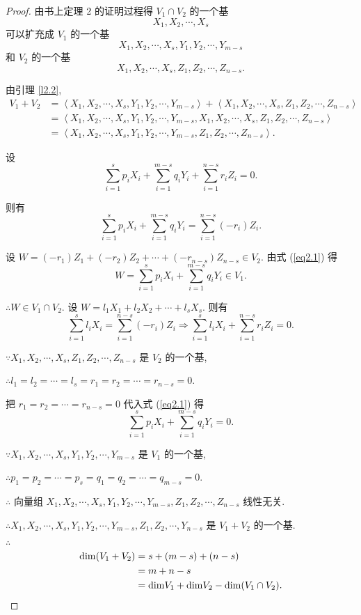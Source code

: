 \documentclass[color=black,device=normal,lang=cn,mode=geye]{elegantnote}
\begin{document}
\begin{proof}
    由书上定理 2 的证明过程得 $V_1\cap V_2$ 的一个基
    \[X_1,X_2,\cdots,X_s\]
    可以扩充成 $V_1$ 的一个基
    \[X_1,X_2,\cdots,X_s,Y_1,Y_2,\cdots,Y_{m-s}\]
    和 $V_2$ 的一个基
    \[X_1,X_2,\cdots,X_s,Z_1,Z_2,\cdots,Z_{n-s}.\]

    由引理 \ref{l2.2},
    \begin{align*}
        V_1+V_2 & =\left<X_1,X_2,\cdots,X_s,Y_1,Y_2,\cdots,Y_{m-s}\right>+\left<X_1,X_2,\cdots,X_s,Z_1,Z_2,\cdots,Z_{n-s}\right> \\
        & =\left<X_1,X_2,\cdots,X_s,Y_1,Y_2,\cdots,Y_{m-s},X_1,X_2,\cdots,X_s,Z_1,Z_2,\cdots,Z_{n-s}\right> \\
        & =\left<X_1,X_2,\cdots,X_s,Y_1,Y_2,\cdots,Y_{m-s},Z_1,Z_2,\cdots,Z_{n-s}\right>.
    \end{align*}

    设
    \begin{equation}\label{eq2.1}
        \sum\limits_{i=1}^sp_iX_i+\sum\limits_{i=1}^{m-s}q_iY_i+\sum\limits_{i=1}^{n-s}r_iZ_i=0.
    \end{equation}

    则有
    \[\sum\limits_{i=1}^sp_iX_i+\sum\limits_{i=1}^{m-s}q_iY_i=\sum\limits_{i=1}^{n-s}(-r_i)Z_i.\]

    设 $W=(-r_1)Z_1+(-r_2)Z_2+\cdots+(-r_{n-s})Z_{n-s}\in V_2$. 由式 (\ref{eq2.1}) 得
    \[W=\sum\limits_{i=1}^sp_iX_i+\sum\limits_{i=1}^{m-s}q_iY_i\in V_1.\]

    $\therefore W\in V_1\cap V_2$. 设 $W=l_1X_1+l_2X_2+\cdots+l_sX_s$. 则有
    \[\sum\limits_{i=1}^sl_iX_i=\sum\limits_{i=1}^{n-s}(-r_i)Z_i\Rightarrow\sum\limits_{i=1}^sl_iX_i+\sum\limits_{i=1}^{n-s}r_iZ_i=0.\]

    $\because X_1,X_2,\cdots,X_s,Z_1,Z_2,\cdots,Z_{n-s}$ 是 $V_2$ 的一个基,

    $\therefore l_1=l_2=\cdots=l_s=r_1=r_2=\cdots=r_{n-s}=0$.

    把 $r_1=r_2=\cdots=r_{n-s}=0$ 代入式 (\ref{eq2.1}) 得
    \[\sum\limits_{i=1}^sp_iX_i+\sum\limits_{i=1}^{m-s}q_iY_i=0.\]

    $\because X_1,X_2,\cdots,X_s,Y_1,Y_2,\cdots,Y_{m-s}$ 是 $V_1$ 的一个基,

    $\therefore p_1=p_2=\cdots=p_s=q_1=q_2=\cdots=q_{m-s}=0$.

    $\therefore$ 向量组 $X_1,X_2,\cdots,X_s,Y_1,Y_2,\cdots,Y_{m-s},Z_1,Z_2,\cdots,Z_{n-s}$ 线性无关.

    $\therefore X_1,X_2,\cdots,X_s,Y_1,Y_2,\cdots,Y_{m-s},Z_1,Z_2,\cdots,Y_{n-s}$ 是 $V_1+V_2$ 的一个基.

    $\therefore$
    \begin{align*}
        \mathrm{dim}(V_1+V_2) & =s+(m-s)+(n-s) \\
        & =m+n-s \\
        & =\mathrm{dim}V_1+\mathrm{dim}V_2-\mathrm{dim}(V_1\cap V_2).\qedhere
    \end{align*}
\end{proof}
\end{document}
